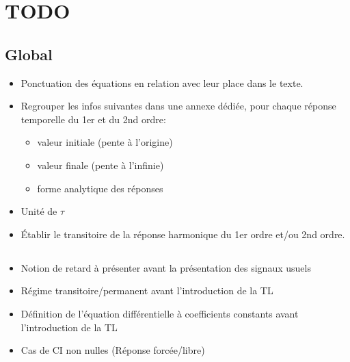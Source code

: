 \chapter{TODO}

\section{Global}
\begin{itemize}
\item Ponctuation des équations en relation avec leur place dans le texte.
\item Regrouper les infos suivantes dans une annexe dédiée, pour chaque réponse temporelle du 1er et du 2nd ordre:
    \begin{itemize}
        \item valeur initiale (pente à l'origine)
        \item valeur finale (pente à l'infinie)
        \item forme analytique des réponses
    \end{itemize}
\item Unité de $\tau$
\item \'Etablir le transitoire de la réponse harmonique du 1er ordre et/ou 2nd ordre.
\end{itemize}

\section{}     
\begin{itemize}
\item Notion de retard à présenter avant la présentation des signaux usuels
\item Régime transitoire/permanent avant l'introduction de la TL
\item Définition de l'équation différentielle à coefficients constants avant l'introduction de la TL
    \item Cas de CI non nulles (Réponse forcée/libre)
\end{itemize}
\section{}
\section{}
